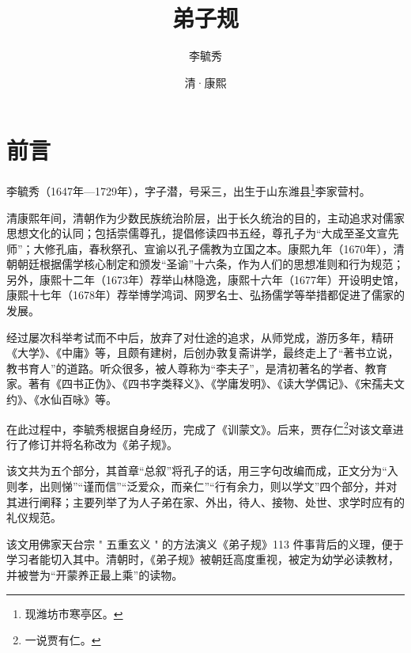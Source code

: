 \documentclass[a4paper,12pt,UTF8,twoside]{ctexbook}
\title{\heiti\zihao{0} 弟子规}
\author{李毓秀}
\date{清·康熙}
\begin{document}
\maketitle
\tableofcontents

\frontmatter
\chapter{前言}

李毓秀（1647年—1729年），字子潜，号采三，出生于山东潍县\footnote{现潍坊市寒亭区。}李家营村。

清康熙年间，清朝作为少数民族统治阶层，出于长久统治的目的，主动追求对儒家思想文化的认同；包括崇儒尊孔，提倡修读四书五经，尊孔子为“大成至圣文宣先师”；大修孔庙，春秋祭孔、宣谕以孔子儒教为立国之本。康熙九年（1670年），清朝朝廷根据儒学核心制定和颁发“圣谕”十六条，作为人们的思想准则和行为规范；另外，康熙十二年（1673年）荐举山林隐逸，康熙十六年（1677年）开设明史馆，康熙十七年（1678年）荐举博学鸿词、网罗名士、弘扬儒学等举措都促进了儒家的发展。

经过屡次科举考试而不中后，放弃了对仕途的追求，从师党成，游历多年，精研《大学》、《中庸》等，且颇有建树，后创办敦复斋讲学，最终走上了“著书立说，教书育人”的道路。听众很多，被人尊称为“李夫子”，是清初著名的学者、教育家。著有《四书正伪》、《四书字类释义》、《学庸发明》、《读大学偶记》、《宋孺夫文约》、《水仙百咏》等。

在此过程中，李毓秀根据自身经历，完成了《训蒙文》。后来，贾存仁\footnote{一说贾有仁。}对该文章进行了修订并将名称改为《弟子规》。

该文共为五个部分，其首章“总叙”将孔子的话，用三字句改编而成，正文分为“入则孝，出则悌”“谨而信”“泛爱众，而亲仁”“行有余力，则以学文”四个部分，并对其进行阐释；主要列举了为人子弟在家、外出，待人、接物、处世、求学时应有的礼仪规范。

该文用佛家天台宗 " 五重玄义 " 的方法演义《弟子规》113 件事背后的义理，便于学习者能切入其中。清朝时，《弟子规》被朝廷高度重视，被定为幼学必读教材，并被誉为“开蒙养正最上乘”的读物。
\end{document}
